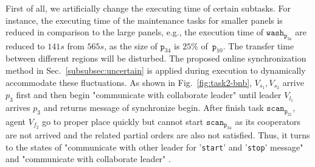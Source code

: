 First of all, we artificially change the executing time of certain subtasks.
For instance, the executing time of the maintenance tasks for smaller panels
is reduced in comparison to the large panels, e.g., the execution time
of $\texttt{wash}_{\texttt{p}_{34}}$ are reduced to $141s$ from $565s$, as the size
of $\texttt{p}_{34}$ is $25\%$ of~$\texttt{p}_{10}$. The transfer time
between different regions will be disturbed. The proposed online synchronization method in
 Sec.~\ref{subsubsec:uncertain} is applied during execution to dynamically accommodate these fluctuations.
 As shown in Fig.~\ref{fig:task2-bnb}, $V_{s_1}, V_{s_2}$ arrive $p_3$ first
and then begin "communicate with collaborate leader" until leader $V_{l_1}$ arrives $p_3$ and returns message of synchronize begin. After finish task $\texttt{scan}_{\texttt{p}_{21}}$,
  agent $V_{f_2} $ go to proper place quickly but cannot start $\texttt{scan}_{\texttt{p}_{34}}$ as its cooperators are not arrived
  and the related partial orders are also not satisfied.
  Thus, it turns to the states of "communicate with other leader for '\texttt{start}' and '\texttt{stop}' message" and "communicate with collaborate leader" .





